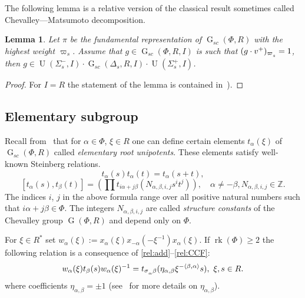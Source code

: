 \documentclass[12pt]{amsart}
\numberwithin{equation}{section}
\newtheorem{lemma}[lemmacounter]{Lemma}
\theoremstyle{definition}
\DeclareMathOperator{\G}{G}
\DeclareMathOperator{\U}{U}
\DeclareMathOperator{\rk}{rk}
\def\ssub#1{\mathchoice
   {_{\lower2pt\hbox{$\scriptstyle #1$}}}
   {_{\lower2pt\hbox{$\scriptstyle #1$}}}
   {_{\lower1.5pt\hbox{$\scriptscriptstyle #1$}}}
   {_{\!\lower1.5pt\hbox{$\scriptscriptstyle #1$}}}}
\begin{document}
The following lemma is a relative version of the classical result sometimes called Chevalley---Matsumoto decomposition.
\begin{lemma}\label{lemma:Chevalley-Matsumoto}
Let $\pi$ be the fundamental representation of $\G_{sc}(\Phi, R)$ with the highest weight $\varpi_s$.
Assume that $g\in \G_{sc}(\Phi, R, I)$ is such that $(g\cdot v^+)_{\varpi\ssub{s}}=1$, then 
$g \in \U(\Sigma_s^-, I) \cdot \G_{sc}(\Delta_s, R, I) \cdot \U(\Sigma_s^+, I)$.
\end{lemma} \begin{proof}  For $I=R$ the statement of the lemma is contained in~\cite[Theorem~1.3]{St78}). \end{proof}

\subsection{Elementary subgroup}
Recall from~\cite{St78, VP} that for $\alpha\in \Phi$, $\xi\in R$ one can define certain elements $t_{\alpha}(\xi)$ of $\G_{sc}(\Phi, R)$ called {\it elementary root unipotents}.
These elements satisfy well-known Steinberg relations.
\begin{equation}\label{rel:add} t_\alpha(s) t_\alpha(t) = t_\alpha(s+t), \end{equation} 
\begin{equation}\label{rel:CCF} [t_\alpha(s),  t_\beta(t)] = \left(\prod\limits t_{i\alpha + j\beta}(N_{\alpha,\beta, i, j}s^i t^j)\right),\quad \alpha\neq-\beta, N_{\alpha, \beta, i, j}\in\mathbb{Z}.\end{equation}
The indices $i$, $j$ in the above formula range over all positive natural numbers such that $i\alpha + j\beta\in\Phi$.
The integers $N_{\alpha, \beta, i, j}$ are called {\it structure constants} of the Chevalley group $\G(\Phi,R)$ and depend only on $\Phi$.

For $\xi\in R^*$ set $w_\alpha(\xi) := x_\alpha(\xi) x_{-\alpha}(-\xi^{-1}) x_{\alpha}(\xi).$
If $\rk(\Phi)\geq 2$ the following relation is a consequence of \ref{rel:add}--\ref{rel:CCF}:
\begin{equation}\label{rel:R3} w_\alpha(\xi) t_{\beta}(s) w_\alpha(\xi)^{-1} =
t_{\sigma\ssub{\alpha}\beta} (\eta_{\alpha, \beta}\xi^{-\langle\beta,\alpha \rangle} s),\ \xi,s\in R. \end{equation}
where coefficients $\eta_{\alpha, \beta} = \pm 1$ (see~\cite[\S13]{VP} for more details on $\eta_{\alpha, \beta}$).
\end{document}
